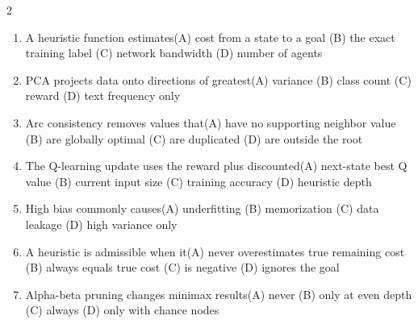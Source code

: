 \documentclass[a4paper]{article}
\begin{document}
\begin{multicols*}{2}
\begin{enumerate}[resume]
\item A heuristic function estimates\newline\hspace*{0.6em}(A) cost from a state to a goal \quad (B) the exact training label \newline\hspace*{0.6em}(C) network bandwidth \quad (D) number of agents
\item PCA projects data onto directions of greatest\newline\hspace*{0.6em}(A) variance \quad (B) class count \newline\hspace*{0.6em}(C) reward \quad (D) text frequency only
\item Arc consistency removes values that\newline\hspace*{0.6em}(A) have no supporting neighbor value \quad (B) are globally optimal \newline\hspace*{0.6em}(C) are duplicated \quad (D) are outside the root
\item The Q-learning update uses the reward plus discounted\newline\hspace*{0.6em}(A) next-state best Q value \quad (B) current input size \newline\hspace*{0.6em}(C) training accuracy \quad (D) heuristic depth
\item High bias commonly causes\newline\hspace*{0.6em}(A) underfitting \quad (B) memorization \newline\hspace*{0.6em}(C) data leakage \quad (D) high variance only
\item A heuristic is admissible when it\newline\hspace*{0.6em}(A) never overestimates true remaining cost \quad (B) always equals true cost \newline\hspace*{0.6em}(C) is negative \quad (D) ignores the goal
\item Alpha-beta pruning changes minimax results\newline\hspace*{0.6em}(A) never \quad (B) only at even depth \newline\hspace*{0.6em}(C) always \quad (D) only with chance nodes

\end{enumerate}
\end{multicols*}
\end{document}
